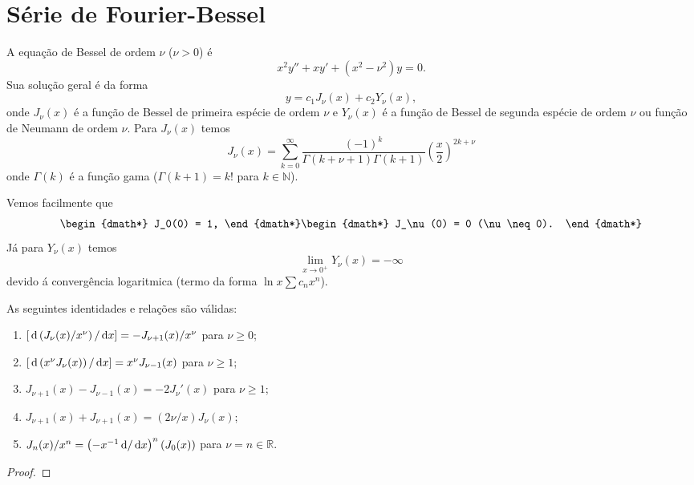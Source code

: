 \section{Série de Fourier-Bessel}
A equação de Bessel de ordem $\nu$ ($\nu > 0$) é
\begin{dmath*}
  x^2 y'' + x y' + \left( x^2 - \nu^2 \right) y = 0.
\end{dmath*}
Sua solução geral é da forma
\begin{dmath*}
  y = c_1 J_\nu(x) + c_2 Y_\nu(x),
\end{dmath*}
onde $J_\nu(x)$ é a função de Bessel de primeira espécie de ordem $\nu$ e
$Y_\nu(x)$ é a função de Bessel de segunda espécie de ordem $\nu$ ou função de
Neumann de ordem $\nu$. Para $J_\nu(x)$ temos
\begin{dmath*}
  J_\nu(x) = \sum_{k = 0}^\infty \frac{(-1)^k}{\Gamma(k + \nu + 1) \Gamma(k +
  1)} \left( \frac{x}{2} \right)^{2k + \nu}
\end{dmath*}
onde $\Gamma(k)$ é a função gama ($\Gamma(k + 1) = k!$ para $k \in \mathbb{N}$).

Vemos facilmente que
\begin{dgroup*}
  \begin{dmath*}
    J_0(0) = 1,
  \end{dmath*}
  \begin{dmath*}
    J_\nu(0) = 0 (\nu \neq 0).
  \end{dmath*}
\end{dgroup*}
Já para $Y_\nu(x)$ temos
\begin{dmath*}
  \lim_{x \to 0^+} Y_\nu(x) = -\infty
\end{dmath*}
devido á convergência logaritmica (termo da forma $\ln x \sum c_n x^n$).
\begin{prop}
  As seguintes identidades e relações são válidas:
  \begin{enumerate}
    \item $\left[ \, \mathrm{d}\left( J_\nu(x) / x^{\nu} \right) / \, \mathrm{d}x \right] = -
      J_{\nu + 1}(x) / x^{\nu}$ para $\nu \geq 0$;
    \item $\left[ \, \mathrm{d}\left( x^{\nu} J_\nu(x) \right) / \, \mathrm{d}x \right] =
      x^{\nu}
      J_{\nu - 1}(x)$ para $\nu \geq 1$;
    \item $J_{\nu + 1}(x) - J_{\nu - 1}(x) = - 2 J_\nu'(x)$ para $\nu \geq 1$;
    \item $J_{\nu + 1}(x) + J_{\nu + 1}(x) = \left( 2 \nu / x \right) J_\nu(x)$;
    \item $J_n(x) / x^n = \left( -x^{-1} \, \mathrm{d} / \, \mathrm{d}x \right)^n \left( J_0(x)
      \right)$ para $\nu = n \in \mathbb{R}$.
  \end{enumerate}
\end{prop}
\begin{proof}
\end{proof}

